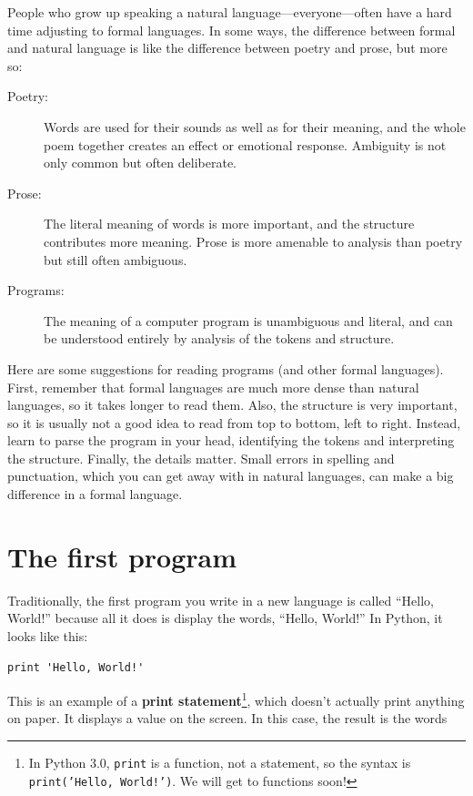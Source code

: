 \documentclass[10pt]{book}
\begin{document}
People who grow up speaking a natural language---everyone---often have a
hard time adjusting to formal languages.  In some ways, the difference
between formal and natural language is like the difference between
poetry and prose, but more so:


\begin{description}

\item[Poetry:] Words are used for their sounds as well as for
their meaning, and the whole poem together creates an effect or
emotional response.  Ambiguity is not only common but often
deliberate.

\item[Prose:] The literal meaning of words is more important,
and the structure contributes more meaning.  Prose is more amenable to
analysis than poetry but still often ambiguous.

\item[Programs:] The meaning of a computer program is unambiguous
and literal, and can be understood entirely by analysis of the
tokens and structure.

\end{description}

Here are some suggestions for reading programs (and other formal
languages).  First, remember that formal languages are much more dense
than natural languages, so it takes longer to read them.  Also, the
structure is very important, so it is usually not a good idea to read
from top to bottom, left to right.  Instead, learn to parse the
program in your head, identifying the tokens and interpreting the
structure.  Finally, the details matter.  Small errors in
spelling and punctuation, which you can get away
with in natural languages, can make a big difference in a formal
language.

\section{The first program}
\label{hello}


Traditionally, the first program you write in a new language
is called ``Hello, World!'' because all it does is display the
words, ``Hello, World!''  In Python, it looks like this:

\beforeverb
\begin{verbatim}
print 'Hello, World!'
\end{verbatim}
\afterverb
%
This is an example of a {\bf print statement}\footnote{In Python 3.0,
  {\tt print} is a function, not a statement, so the syntax is {\tt
    print('Hello, World!')}.  We will get to functions soon!}, which
doesn't actually print anything on paper.  It displays a value on the
screen.  In this case, the result is the words
\end{document}
